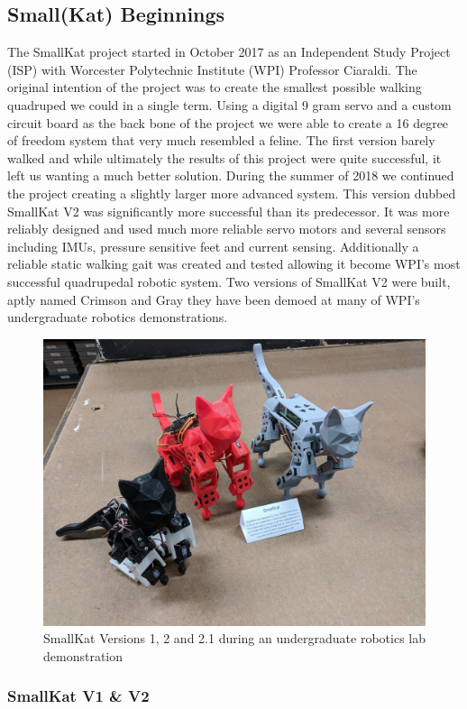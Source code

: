 \subsection{Small(Kat) Beginnings}
 The SmallKat project started in October 2017 as an Independent Study Project (ISP) with Worcester Polytechnic Institute (WPI) Professor Ciaraldi. The original intention of the project was to create the smallest possible walking quadruped we could in a single term. Using a digital 9 gram servo and a custom circuit board as the back bone of the project we were able to create a 16 degree of freedom system that very much resembled a feline. The first version barely walked and while ultimately the results of this project were quite successful, it left us wanting a much better solution. During the summer of 2018 we continued the project creating a slightly larger more advanced system. This version dubbed SmallKat V2 was significantly more successful than its predecessor. It was more reliably designed and used much more reliable servo motors and several sensors including IMUs, pressure sensitive feet and current sensing. Additionally a reliable static walking gait was created and tested allowing it become WPI's most successful quadrupedal robotic system. Two versions of SmallKat V2 were built, aptly named Crimson and Gray they have been demoed at many of WPI's undergraduate robotics demonstrations. 
     \begin{figure}[H]
        \centering
        \includegraphics[width=120mm]{figures/V1andV2.jpg}
        \caption{SmallKat Versions 1, 2 and 2.1 during an undergraduate robotics lab demonstration}
        \label{fig:my_label}
    \end{figure}
\subsubsection{SmallKat V1 \& V2}

